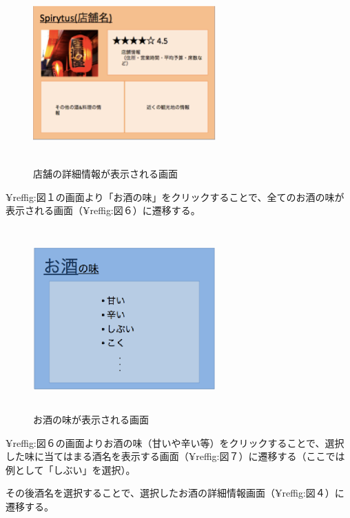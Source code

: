 \documentclass[a4j,titlepage]{jarticle}
\begin{document}
\begin {figure}[!htbp]
    \begin{center}
    \includegraphics [height=7cm, width=7cm]{5.eps}
    \caption {店舗の詳細情報が表示される画面}
    \label {fig:5}
    \end{center}
\end {figure}

¥ref{fig:図１}の画面より「お酒の味」をクリックすることで、全てのお酒の味が表示される画面（¥ref{fig:図６}）に遷移する。
\clearpage
\begin {figure}[!htbp]
    \begin{center}
    \includegraphics [height=7cm, width=7cm]{6.eps}
    \caption {お酒の味が表示される画面}
    \label {fig:6}
    \end{center}
\end {figure}
¥ref{fig:図６}の画面よりお酒の味（甘いや辛い等）をクリックすることで、選択した味に当てはまる酒名を表示する画面（¥ref{fig:図７}）に遷移する（ここでは例として「しぶい」を選択）。



その後酒名を選択することで、選択したお酒の詳細情報画面（¥ref{fig:図４}）に遷移する。
\end{document}
